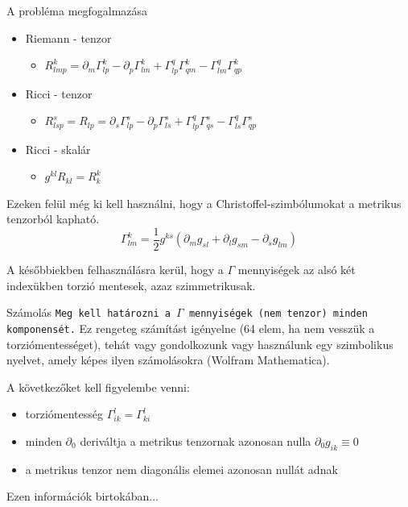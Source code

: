 \documentclass[10pt]{beamer}
\begin{document}
\begin{frame}[t]{A probléma megfogalmazása}
\begin{itemize}
\item Riemann - tenzor
\begin{itemize}
\item $R^{k}_{lmp} = \partial_{m}\Gamma_{lp}^{k} - \partial_{p}\Gamma_{lm}^{k} + \Gamma_{lp}^{q}\Gamma_{qm}^{k} - \Gamma_{lm}^{q}\Gamma_{qp}^{k}$
\end{itemize}
\item Ricci - tenzor
\begin{itemize}
\item $R^{s}_{lsp} = R_{lp} = \partial_{s}\Gamma_{lp}^{s} - \partial_{p}\Gamma_{ls}^{s} + \Gamma_{lp}^{q}\Gamma_{qs}^{s} - \Gamma_{ls}^{q}\Gamma_{qp}^{s}$
\end{itemize}
\item Ricci - skalár
\begin{itemize}
\item $g^{kl}R_{kl} = R_{k}^{k}$
\end{itemize}
\end{itemize}
\par Ezeken felül még ki kell használni, hogy a Christoffel-szimbólumokat a metrikus tenzorból kapható.
\begin{equation*}
\Gamma_{lm}^{k} = \frac{1}{2}g^{ks}(\partial_{m}g_{sl} + \partial_{l}g_{sm} - \partial_{s}g_{lm})
\end{equation*}
\par A későbbiekben felhasználásra kerül, hogy a $\Gamma$ mennyiségek az alsó két indexükben torzió mentesek, azaz 
szimmetrikusak.
\end{frame}

\begin{frame}[t]{Számolás}
\texttt{Meg kell határozni a $\Gamma$ mennyiségek (nem tenzor) minden komponensét.} Ez rengeteg számítást igényelne
(64 elem, ha nem vesszük a torziómentességet), tehát vagy gondolkozunk vagy használunk egy szimbolikus nyelvet, amely képes
ilyen számolásokra (Wolfram Mathematica).
\par A következőket kell figyelembe venni:
\begin{itemize}
\item torziómentesség $\Gamma_{ik}^{l} = \Gamma_{ki}^{l}$
\item minden $\partial_{0}$ deriváltja a metrikus tenzornak azonosan nulla $\partial_{0}g_{ik}\equiv 0$
\item a metrikus tenzor nem diagonális elemei azonosan nullát adnak
\end{itemize}
\vfill
\par Ezen információk birtokában...
\end{frame}
\end{document}

